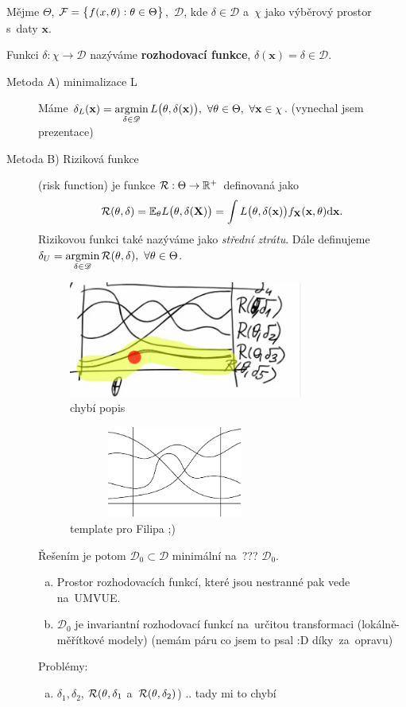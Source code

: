 \begin{define}
	Mějme $\Theta$, $\mathcal{F}=\big\{ f(x,\theta):\theta\in\Theta \big\}$,~$\mathscr{D}$, kde $\delta\in\mathscr{D}$ a~$\chi$ jako výběrový prostor s~daty $\textbf{x}$.
	
	Funkci $\delta:\chi\to\mathscr{D}$ nazýváme \textbf{rozhodovací funkce}, $\delta(\textbf{x})=\delta\in\mathscr{D}$. 
\end{define}
\begin{description}
	\item[Metoda A) minimalizace L] Máme $\delta_L(\textbf{x})=\mathop{\mathrm{argmin}}\limits_{\delta\in\mathscr{D}} L\big(\theta,\delta(\textbf{x})\big),~\forall \theta\in\Theta,~\forall\textbf{x}\in\chi$. (vynechal jsem prezentace)
	\item[Metoda B) Riziková funkce] (risk function) je funkce $\mathcal{R}:\Theta\to\mathbb{R}^+$ definovaná jako $$\mathcal{R}(\theta,\delta)=\mathbb{E}_\theta L\big(\theta,\delta(\textbf{X})\big)=\int L\big(\theta,\delta(\textbf{x})\big)f_\textbf{X}(\textbf{x},\theta)\mathrm{d}\textbf{x}.$$
	Rizikovou funkci také nazýváme jako \textit{střední ztrátu}. Dále definujeme $\delta_U=\mathop{\mathrm{argmin}}\limits_{\delta\in\mathscr{D}} \mathcal{R}(\theta,\delta),~\forall\theta\in\Theta$.
\begin{figure}[h]
	\centering
	\includegraphics[width=0.5\linewidth]{pictures/P4_1}
	\caption{chybí popis}
	\label{fig:p41}
\end{figure}\begin{figure}[h]
\centering
\includegraphics[width=7cm,height=3cm]{pictures/P4_1v2}
\caption{template pro Filipa ;)}
\label{fig:p41v2}
\end{figure}
Řešením je potom $\mathscr{D}_0\subset\mathscr{D}$ minimální na~??? $\mathscr{D}_0$.\begin{enumerate}[a)]
	\item  Prostor rozhodovacích funkcí, které jsou nestranné pak vede na~UMVUE.
	\item $\mathscr{D}_0$ je invariantní rozhodovací funkcí na~určitou transformaci (lokálně-měřítkové modely) (nemám páru co jsem to psal :D díky~za~opravu)
\end{enumerate}

Problémy: \begin{enumerate}[a)]
	\item $\delta_1,\delta_2$, $\mathcal{R}(\theta,\delta_1$ a~$\mathcal{R}(\theta,\delta_2)$) .. tady mi to chybí
\end{enumerate}
\end{description}

